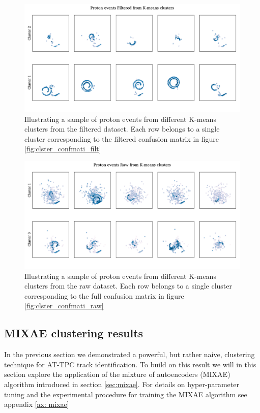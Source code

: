 \documentclass[review,number,sort&compress]{elsarticle}
\begin{document}
\begin{figure}
\includegraphics[width=\textwidth]{custom_work/Filteredexamples.pdf}
\caption[Filtered proton samples by cluster belonging]{Illustrating a sample of proton events from different K-means clusters from the filtered dataset. Each row belongs to a single cluster corresponding to the filtered confusion matrix in figure \ref{fig:clster_confmati_filt}}\label{fig:filtered_vgg_clster_repr}
\end{figure} 

\begin{figure}
\includegraphics[width=\textwidth]{custom_work/Rawexamples.pdf}
\caption[Full proton samples by cluster belonging]{Illustrating a sample of proton events from different K-means clusters from the raw dataset. Each row belongs to a single cluster corresponding to the full confusion matrix in figure \ref{fig:clster_confmati_raw}}\label{fig:full_vgg_clster_repr}
\end{figure} 


\subsection{MIXAE clustering results}

In the previous section we demonstrated a powerful, but rather naive, clustering technique for AT-TPC track identification. To build on this result we will in this section explore the application of the mixture of autoencoders (MIXAE) algorithm introduced in section \ref{sec:mixae}.
For details on hyper-parameter tuning and the experimental procedure for training the MIXAE algorithm see appendix \ref{ax: mixae}
\end{document}
